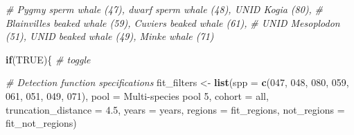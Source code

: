 \documentclass[
]{book}
\newenvironment{Shaded}{\begin{snugshade}}{\end{snugshade}}
\newcommand{\AttributeTok}[1]{\textcolor[rgb]{0.13,0.29,0.53}{#1}}
\newcommand{\CommentTok}[1]{\textcolor[rgb]{0.56,0.35,0.01}{\textit{#1}}}
\newcommand{\ConstantTok}[1]{\textcolor[rgb]{0.56,0.35,0.01}{#1}}
\newcommand{\ControlFlowTok}[1]{\textcolor[rgb]{0.13,0.29,0.53}{\textbf{#1}}}
\newcommand{\FloatTok}[1]{\textcolor[rgb]{0.00,0.00,0.81}{#1}}
\newcommand{\FunctionTok}[1]{\textcolor[rgb]{0.13,0.29,0.53}{\textbf{#1}}}
\newcommand{\NormalTok}[1]{#1}
\newcommand{\OtherTok}[1]{\textcolor[rgb]{0.56,0.35,0.01}{#1}}
\newcommand{\StringTok}[1]{\textcolor[rgb]{0.31,0.60,0.02}{#1}}
\begin{document}
\begin{Shaded}
\begin{Highlighting}[]
\CommentTok{\# Pygmy sperm whale (47), dwarf sperm whale (48), UNID Kogia (80),}
\CommentTok{\# Blainville\textquotesingle{}s beaked whale (59), Cuvier\textquotesingle{}s beaked whale (61),}
\CommentTok{\# UNID Mesoplodon (51), UNID beaked whale (49), Minke whale (71)}

\ControlFlowTok{if}\NormalTok{(}\ConstantTok{TRUE}\NormalTok{)\{ }\CommentTok{\# toggle}

  \CommentTok{\# Detection function specifications}
\NormalTok{  fit\_filters }\OtherTok{\textless{}{-}}
    \FunctionTok{list}\NormalTok{(}\AttributeTok{spp =} \FunctionTok{c}\NormalTok{(}\StringTok{\textquotesingle{}047\textquotesingle{}}\NormalTok{, }\StringTok{\textquotesingle{}048\textquotesingle{}}\NormalTok{, }\StringTok{\textquotesingle{}080\textquotesingle{}}\NormalTok{, }\StringTok{\textquotesingle{}059\textquotesingle{}}\NormalTok{, }\StringTok{\textquotesingle{}061\textquotesingle{}}\NormalTok{, }\StringTok{\textquotesingle{}051\textquotesingle{}}\NormalTok{, }\StringTok{\textquotesingle{}049\textquotesingle{}}\NormalTok{, }\StringTok{\textquotesingle{}071\textquotesingle{}}\NormalTok{),}
         \AttributeTok{pool =} \StringTok{\textquotesingle{}Multi{-}species pool 5\textquotesingle{}}\NormalTok{,}
         \AttributeTok{cohort =} \StringTok{\textquotesingle{}all\textquotesingle{}}\NormalTok{,}
         \AttributeTok{truncation\_distance =} \FloatTok{4.5}\NormalTok{,}
         \AttributeTok{years =}\NormalTok{ years,}
         \AttributeTok{regions =}\NormalTok{ fit\_regions,}
         \AttributeTok{not\_regions =}\NormalTok{ fit\_not\_regions)}


\end{Highlighting}
\end{Shaded}
\end{document}
